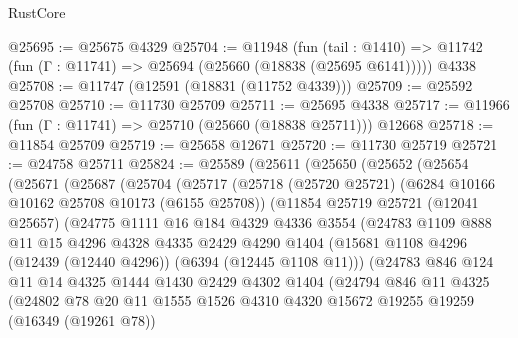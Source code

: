 \begin{lexlean}{RustCore}
\begin{coremodule}
@25695 := @25675 @4329
@25704 := @11948
    (fun (tail : @1410) => @11742 (fun (Γ : @11741) => @25694 (@25660 (@18838 (@25695 @6141)))))
    @4338
@25708 := @11747 (@12591 (@18831 (@11752 @4339)))
@25709 := @25592 @25708
@25710 := @11730 @25709
@25711 := @25695 @4338
@25717 := @11966 (fun (Γ : @11741) => @25710 (@25660 (@18838 @25711))) @12668
@25718 := @11854 @25709
@25719 := @25658 @12671
@25720 := @11730 @25719
@25721 := @24758 @25711
@25824 := @25589
    (@25611
      (@25650
        (@25652
          (@25654
            (@25671
              (@25687
                (@25704
                  (@25717
                    (@25718
                      (@25720 @25721)
                      (@6284 @10166 @10162 @25708 @10173 (@6155 @25708))
                      (@11854
                        @25719
                        @25721
                        (@12041 @25657)
                        (@24775
                          @1111
                          @16
                          @184
                          @4329
                          @4336
                          @3554
                          (@24783
                            @1109
                            @888
                            @11
                            @15
                            @4296
                            @4328
                            @4335
                            @2429
                            @4290
                            @1404
                            (@15681 @1108 @4296 (@12439 (@12440 @4296)) (@6394 (@12445 @1108 @11)))
                            (@24783
                              @846
                              @124
                              @11
                              @14
                              @4325
                              @1444
                              @1430
                              @2429
                              @4302
                              @1404
                              (@24794
                                @846
                                @11
                                @4325
                                (@24802
                                  @78
                                  @20
                                  @11
                                  @1555
                                  @1526
                                  @4310
                                  @4320
                                  @15672
                                  @19255
                                  @19259
                                  (@16349 (@19261 @78))

\end{coremodule}
\end{lexlean}

